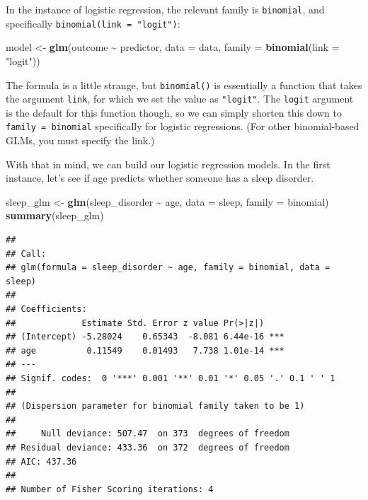 \documentclass[
]{book}
\newenvironment{Shaded}{\begin{snugshade}}{\end{snugshade}}
\newcommand{\AttributeTok}[1]{\textcolor[rgb]{0.13,0.29,0.53}{#1}}
\newcommand{\FunctionTok}[1]{\textcolor[rgb]{0.13,0.29,0.53}{\textbf{#1}}}
\newcommand{\NormalTok}[1]{#1}
\newcommand{\OtherTok}[1]{\textcolor[rgb]{0.56,0.35,0.01}{#1}}
\newcommand{\SpecialCharTok}[1]{\textcolor[rgb]{0.81,0.36,0.00}{\textbf{#1}}}
\newcommand{\StringTok}[1]{\textcolor[rgb]{0.31,0.60,0.02}{#1}}
\begin{document}
In the instance of logistic regression, the relevant family is \texttt{binomial}, and specifically \texttt{binomial(link\ =\ "logit")}:

\begin{Shaded}
\begin{Highlighting}[]
\NormalTok{model }\OtherTok{\textless{}{-}} \FunctionTok{glm}\NormalTok{(outcome }\SpecialCharTok{\textasciitilde{}}\NormalTok{ predictor, }\AttributeTok{data =}\NormalTok{ data, }\AttributeTok{family =} \FunctionTok{binomial}\NormalTok{(}\AttributeTok{link =} \StringTok{"logit"}\NormalTok{))}
\end{Highlighting}
\end{Shaded}

The formula is a little strange, but \texttt{binomial()} is essentially a function that takes the argument \texttt{link}, for which we set the value as \texttt{"logit"}. The \texttt{logit} argument is the default for this function though, so we can simply shorten this down to \texttt{family\ =\ binomial} specifically for logistic regressions. (For other binomial-based GLMs, you must specify the link.)

With that in mind, we can build our logistic regression models. In the first instance, let's see if age predicts whether someone has a sleep disorder.

\begin{Shaded}
\begin{Highlighting}[]
\NormalTok{sleep\_glm }\OtherTok{\textless{}{-}} \FunctionTok{glm}\NormalTok{(sleep\_disorder }\SpecialCharTok{\textasciitilde{}}\NormalTok{ age, }\AttributeTok{data =}\NormalTok{ sleep, }\AttributeTok{family =}\NormalTok{ binomial)}
\FunctionTok{summary}\NormalTok{(sleep\_glm)}
\end{Highlighting}
\end{Shaded}

\begin{verbatim}
## 
## Call:
## glm(formula = sleep_disorder ~ age, family = binomial, data = sleep)
## 
## Coefficients:
##             Estimate Std. Error z value Pr(>|z|)    
## (Intercept) -5.28024    0.65343  -8.081 6.44e-16 ***
## age          0.11549    0.01493   7.738 1.01e-14 ***
## ---
## Signif. codes:  0 '***' 0.001 '**' 0.01 '*' 0.05 '.' 0.1 ' ' 1
## 
## (Dispersion parameter for binomial family taken to be 1)
## 
##     Null deviance: 507.47  on 373  degrees of freedom
## Residual deviance: 433.36  on 372  degrees of freedom
## AIC: 437.36
## 
## Number of Fisher Scoring iterations: 4
\end{verbatim}
\end{document}
